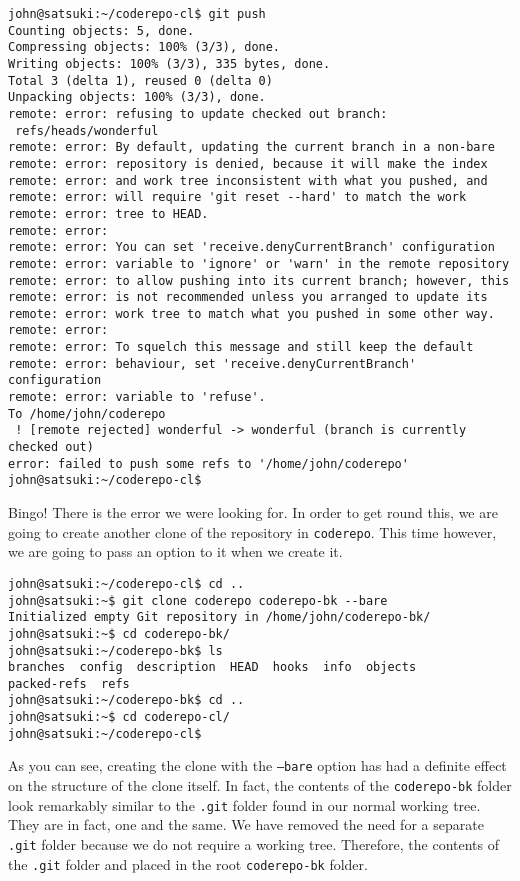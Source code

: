 \begin{Verbatim}
john@satsuki:~/coderepo-cl$ git push
Counting objects: 5, done.
Compressing objects: 100% (3/3), done.
Writing objects: 100% (3/3), 335 bytes, done.
Total 3 (delta 1), reused 0 (delta 0)
Unpacking objects: 100% (3/3), done.
remote: error: refusing to update checked out branch: 
 refs/heads/wonderful
remote: error: By default, updating the current branch in a non-bare 
remote: error: repository is denied, because it will make the index 
remote: error: and work tree inconsistent with what you pushed, and 
remote: error: will require 'git reset --hard' to match the work 
remote: error: tree to HEAD.
remote: error: 
remote: error: You can set 'receive.denyCurrentBranch' configuration 
remote: error: variable to 'ignore' or 'warn' in the remote repository 
remote: error: to allow pushing into its current branch; however, this 
remote: error: is not recommended unless you arranged to update its 
remote: error: work tree to match what you pushed in some other way.
remote: error: 
remote: error: To squelch this message and still keep the default 
remote: error: behaviour, set 'receive.denyCurrentBranch' configuration 
remote: error: variable to 'refuse'.
To /home/john/coderepo
 ! [remote rejected] wonderful -> wonderful (branch is currently checked out)
error: failed to push some refs to '/home/john/coderepo'
john@satsuki:~/coderepo-cl$ 
\end{Verbatim}

Bingo!  There is the error we were looking for.  In order to get round this, we are going to create another clone of the repository in \texttt{coderepo}.  This time however, we are going to pass an option to it when we create it.

\begin{Verbatim}
john@satsuki:~/coderepo-cl$ cd ..
john@satsuki:~$ git clone coderepo coderepo-bk --bare
Initialized empty Git repository in /home/john/coderepo-bk/
john@satsuki:~$ cd coderepo-bk/
john@satsuki:~/coderepo-bk$ ls
branches  config  description  HEAD  hooks  info  objects  
packed-refs  refs
john@satsuki:~/coderepo-bk$ cd ..
john@satsuki:~$ cd coderepo-cl/
john@satsuki:~/coderepo-cl$ 
\end{Verbatim}

As you can see, creating the clone with the \texttt{--bare} option has had a definite effect on the structure of the clone itself.  In fact, the contents of the \texttt{coderepo-bk} folder look remarkably similar to the \texttt{.git} folder found in our normal working tree.  They are in fact, one and the same.  We have removed the need for a separate \texttt{.git} folder because we do not require a working tree.  Therefore, the contents of the \texttt{.git} folder and placed in the root \texttt{coderepo-bk} folder.

